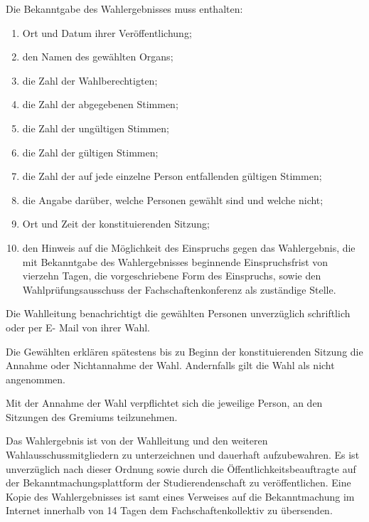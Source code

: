 \documentclass[%
draft,%
multilinesections%
]{fswo}
\begin{document}
\begin{contract}
\label{cls-wahlergebnis}
Die Bekanntgabe des Wahlergebnisses muss enthalten:
\begin{enumerate}
\item Ort und Datum ihrer Veröffentlichung;
\item den Namen des gewählten Organs;
\item die Zahl der Wahlberechtigten;
\item die Zahl der abgegebenen Stimmen;
\item die Zahl der ungültigen Stimmen;
\item die Zahl der gültigen Stimmen;
\item die Zahl der auf jede einzelne Person entfallenden gültigen Stimmen;
\item die Angabe darüber, welche Personen gewählt sind und welche nicht;
\item Ort und Zeit der konstituierenden Sitzung;
\item den Hinweis auf die Möglichkeit des Einspruchs gegen das Wahlergebnis, die mit Bekanntgabe des Wahlergebnisses beginnende Einspruchsfrist von vierzehn Tagen, die vorgeschriebene Form des Einspruchs, sowie den Wahlprüfungsausschuss der Fachschaftenkonferenz als zuständige Stelle.
\end{enumerate}

Die Wahlleitung benachrichtigt die gewählten Personen unverzüglich schriftlich oder per E- Mail von ihrer Wahl. %

Die Gewählten erklären spätestens bis zu Beginn der konstituierenden Sitzung die Annahme oder Nichtannahme der Wahl. Andernfalls gilt die Wahl als nicht angenommen. \label{cls-wahlergebnis:abs-wahlannahme}

Mit der Annahme der Wahl verpflichtet sich die jeweilige Person, an den Sitzungen des Gremiums teilzunehmen.

Das Wahlergebnis ist von der Wahlleitung und den weiteren Wahlausschussmitgliedern zu unterzeichnen und dauerhaft aufzubewahren.
Es ist unverzüglich nach  dieser Ordnung sowie durch die Öffentlichkeitsbeauftragte auf der Bekanntmachungsplattform der Studierendenschaft zu veröffentlichen.
Eine Kopie des Wahlergebnisses ist samt eines Verweises auf die Bekanntmachung im Internet innerhalb von 14 Tagen dem Fachschaftenkollektiv zu übersenden.
\end{contract}
\end{document}
